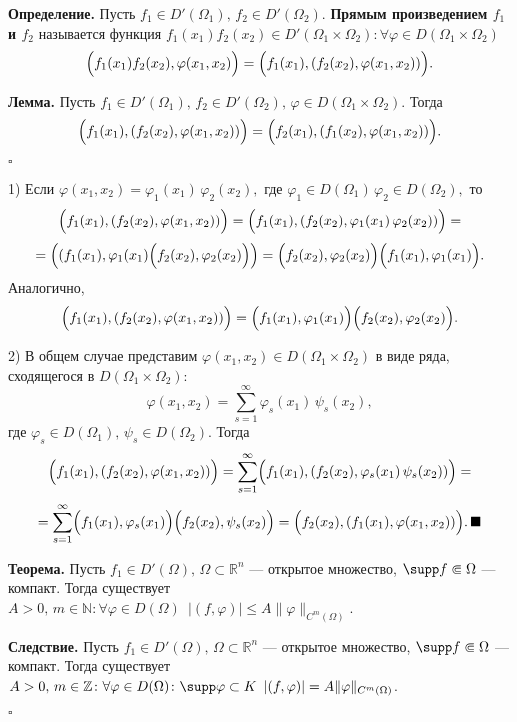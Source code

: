 \documentclass[unicode,12pt,draft]{article}
\begin{document}

\textbf{Определение.} Пусть $f_1\in D'(\Omega_1),\,f_2\in
D'(\Omega_2).$ \textbf{Прямым произведением $f_1$ и $f_2$}
называется функция $f_1(x_1)f_2(x_2)\in
D'(\Omega_1\times\Omega_2)\colon \forall\varphi \in
D(\Omega_1\times\Omega_2)$
$$\Bigl(f_1(x_1)f_2(x_2),\varphi(x_1,x_2)\Bigr)=\Bigl(f_1(x_1),(f_2(x_2),\varphi(x_1,x_2))\Bigr).$$

\textbf{Лемма.} Пусть $f_1\in D'(\Omega_1),\,f_2\in
D'(\Omega_2),\,\varphi \in D(\Omega_1\times\Omega_2).$ Тогда
$$\Bigl(f_1(x_1),(f_2(x_2),\varphi(x_1,x_2))\Bigr)=\Bigl(f_2(x_1),(f_1(x_2),\varphi(x_1,x_2))\Bigr).$$

$\square$

1) Если $\varphi(x_1,x_2)=\varphi_1(x_1)\,\varphi_2(x_2),$ где
$\varphi_1\in D(\Omega_1)\,\varphi_2\in D(\Omega_2),$ то
$$\Bigl(f_1(x_1),(f_2(x_2),\varphi(x_1,x_2))\Bigr)=
\Bigl(f_1(x_1),(f_2(x_2),\varphi_1(x_1)\,\varphi_2(x_2))\Bigr)=$$
$$=\left((f_1(x_1),\varphi_1(x_1)\Bigl(f_2(x_2),\varphi_2(x_2)\Bigr)\right)=
\Bigl(f_2(x_2),\varphi_2(x_2)\Bigr)\Bigl(f_1(x_1),\varphi_1(x_1)\Bigr).$$
Аналогично,
$$\Bigl(f_1(x_1),(f_2(x_2),\varphi(x_1,x_2))\Bigr)=
\Bigl(f_1(x_1),\varphi_1(x_1)\Bigr)\Bigl(f_2(x_2),\varphi_2(x_2)\Bigr).$$

2) В общем случае представим $\varphi(x_1,x_2)\in
D(\Omega_1\times\Omega_2)$ в виде ряда, сходящегося в
$D(\Omega_1\times\Omega_2)$:
$$\varphi(x_1,x_2)=\sum_{s=1}^{\infty}\varphi_s(x_1)\,\psi_s(x_2),$$
где $\varphi_s \in D(\Omega_1),\,\psi_s \in D(\Omega_2).$ Тогда
$$\Bigl(f_1(x_1),(f_2(x_2),\varphi(x_1,x_2))\Bigr)=
\sum_{s=1}^{\infty}\Bigl(f_1(x_1),(f_2(x_2),\varphi_s(x_1)\,\psi_s(x_2))\Bigr)=$$
$$=\sum_{s=1}^{\infty}\Bigl(f_1(x_1),\varphi_s(x_1)\Bigr)\Bigl(f_2(x_2),\psi_s(x_2)\Bigr)=
\Bigl(f_2(x_2),(f_1(x_1),\varphi(x_1,x_2))\Bigr).\,\blacksquare$$


\textbf{Теорема.} Пусть $f_1\in D'(\Omega),\,\Omega\subset\mathbb
R^n$ --- открытое множество, $\supp f\Subset\Omega$ --- компакт.
Тогда существует $A>0,\,m\in \mathbb N\colon \forall \varphi\in
D(\Omega)\,\,\,|(f,\varphi)|\le A\|\varphi\|_{C^m(\Omega)}$.

\textbf{Следствие.} Пусть $f_1\in
D'(\Omega),\,\Omega\subset\mathbb R^n$ --- открытое множество,
$\supp f\Subset\Omega$ --- компакт. Тогда существует $A>0,\,m\in
\mathbb Z\colon \forall \varphi\in D(\Omega)\colon \supp
\varphi\subset K \,\,\,|(f,\varphi)|= A\|\varphi\|_{C^m(\Omega)}$.

$\square$
\end{document}
